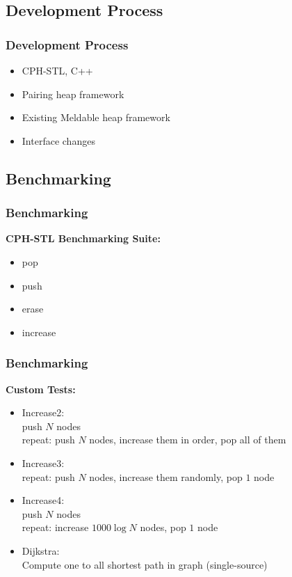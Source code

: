 \documentclass{beamer}
\begin{document}
\begin{frame}
\subsection{Development Process}
\frametitle{Development Process}

\begin{itemize}
\item CPH-STL, C++
\item Pairing heap framework
\item Existing Meldable heap framework
\item Interface changes
\end{itemize}



\end{frame}

\begin{frame}
\subsection{Benchmarking}
\frametitle{Benchmarking}



\textbf{CPH-STL Benchmarking Suite:}
\begin{itemize}
\item pop
\item push
\item erase
\item increase
\end{itemize}


\end{frame}

\begin{frame}
\frametitle{Benchmarking}

\textbf{Custom Tests:}
\begin{itemize}
\item Increase2:\\
  push $N$ nodes\\
  repeat: push $N$ nodes, increase them in order, pop all of them
\item Increase3: \\
  repeat: push $N$ nodes, increase them randomly, pop $1$ node
\item Increase4: \\
  push $N$ nodes \\
  repeat: increase $1000 \log N$ nodes, pop $1$ node
\item Dijkstra: \\
  Compute one to all shortest path in graph (single-source)
\end{itemize}

\end{frame}
\end{document}
